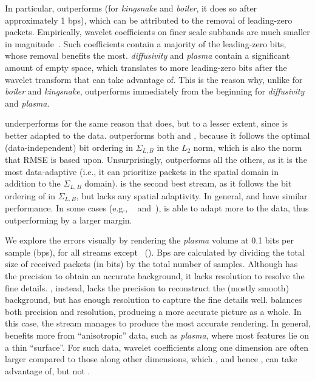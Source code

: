In particular, \sbit outperforms \slvl (for \emph{kingsnake} and \emph{boiler}, it does so after
approximately 1 bps), which can be attributed to the removal of leading-zero packets. Empirically,
wavelet coefficients on finer scale subbands are much smaller in magnitude~\cite{spiht1996}. Such
coefficients contain a majority of the leading-zero bits, whose removal benefits \sbit the most.
\emph{diffusivity} and \emph{plasma} contain a significant amount of empty space, which translates
to more leading-zero bits after the wavelet transform that \sbit can take advantage of. This is the
reason why, unlike for \emph{boiler} and \emph{kingsnake}, \sbit outperforms \slvl immediately from
the beginning for \emph{diffusivity} and \emph{plasma}.

\smag underperforms for the same reason that \slvl does, but to a lesser extent, since \smag is
better adapted to the data. \swav outperforms both \slvl and \sbit, because it follows the optimal
(data-independent) bit ordering in $\Sigma_{L,B}$ in the $L_2$ norm, which is also the norm that
RMSE is based upon. Unsurprisingly, \srop outperforms all the others, as it is the most
data-adaptive (i.e., it can prioritize packets in the spatial domain in addition to the
$\Sigma_{L,B}$ domain). \srsg is the second best stream, as it follows the bit ordering of \srop in
$\Sigma_{L,B}$, but lacks any spatial adaptivity. In general, \swav and \ssig have similar
performance. In some cases (e.g., ~ and~), \ssig is
able to adapt more to the data, thus outperforming \swav by a larger margin.

We explore the errors visually by rendering the \emph{plasma} volume at 0.1 bits per sample (bps), 
for all streams except \srop ~(). Bps are calculated by dividing
the total size of received packets (in bits) by the total number of samples.
Although \slvl has the precision to obtain an accurate
background, it lacks resolution to resolve the fine details. \sbit, instead, lacks the precision to
reconstruct the (mostly smooth) background, but has enough resolution to capture the fine details
well. \swav balances both precision and resolution, producing a more accurate picture as a whole. In
this case, the \ssig stream manages to produce the most accurate rendering. In general, \srsg
benefits more from ``anisotropic'' data, such as \emph{plasma}, where most features lie on a thin
``surface''. For such data, wavelet coefficients along one dimension are often larger compared to
those along other dimensions, which \srop, and hence \srsg, can take advantage of, but not \swav.
